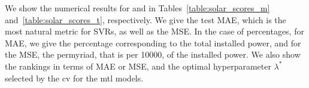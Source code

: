 
We show the numerical results for  and  in Tables~\ref{table:solar_scores_m} and~\ref{table:solar_scores_t}, respectively. We give the test MAE, which is the most natural metric for SVRs, as well as the MSE. 
In the case of percentages, for MAE, we give the percentage corresponding to the total installed power, and for the MSE, the permyriad, that is per \num{10000}, of the installed power.
%
We also show the rankings in terms of MAE or MSE, and the optimal hyperparameter $\lambda^*$ selected by the \acrshort{cv} for the \acrshort{mtl} models.
%

